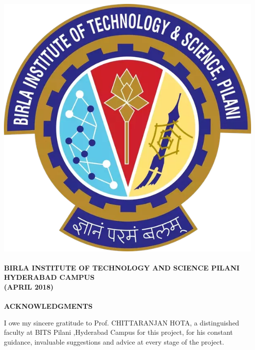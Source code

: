 \documentclass{report}
\begin{document}
\paragraph{}
\begin{center}
\includegraphics[scale=0.1]{bits_logo.png} 
\end{center}

\paragraph{}
\begin{center}
\textbf{BIRLA INSTITUTE OF TECHNOLOGY AND SCIENCE PILANI} \\
\textbf{HYDERABAD CAMPUS} \\
\textbf{(APRIL 2018) }
\end{center}

\thispagestyle{empty}
\newpage





\paragraph{}
\begin{center}
\textbf{\Large{ACKNOWLEDGMENTS}} \\[30pt]
\end{center}
I owe my sincere gratitude to Prof. CHITTARANJAN HOTA, a distinguished faculty at BITS Pilani ,Hyderabad Campus for this project, for his constant
guidance, invaluable suggestions and advice at every stage of the project.
\end{document}

